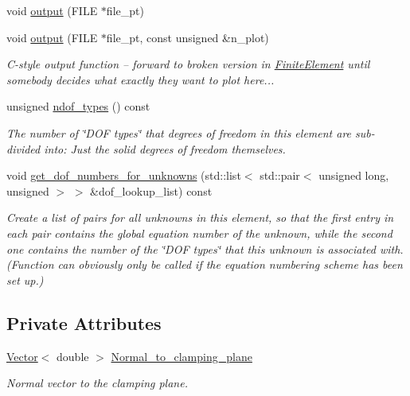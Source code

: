 \begin{DoxyCompactItemize}
void \hyperlink{classoomph_1_1ClampedHermiteShellBoundaryConditionElement_af1b8f1785d656386e36a01336611a22d}{output} (F\+I\+LE $\ast$file\+\_\+pt)
\item 
void \hyperlink{classoomph_1_1ClampedHermiteShellBoundaryConditionElement_ade7c773aa9f4587d25945b4f4860a690}{output} (F\+I\+LE $\ast$file\+\_\+pt, const unsigned \&n\+\_\+plot)
\begin{DoxyCompactList}\small\item\em C-\/style output function -- forward to broken version in \hyperlink{classoomph_1_1FiniteElement}{Finite\+Element} until somebody decides what exactly they want to plot here... \end{DoxyCompactList}\item 
unsigned \hyperlink{classoomph_1_1ClampedHermiteShellBoundaryConditionElement_a189db759eda561b5ae63ae9527b3ae39}{ndof\+\_\+types} () const
\begin{DoxyCompactList}\small\item\em The number of \char`\"{}\+D\+O\+F types\char`\"{} that degrees of freedom in this element are sub-\/divided into\+: Just the solid degrees of freedom themselves. \end{DoxyCompactList}\item 
void \hyperlink{classoomph_1_1ClampedHermiteShellBoundaryConditionElement_a7b18a5df8ade2926ccd6e7bcfa182dd9}{get\+\_\+dof\+\_\+numbers\+\_\+for\+\_\+unknowns} (std\+::list$<$ std\+::pair$<$ unsigned long, unsigned $>$ $>$ \&dof\+\_\+lookup\+\_\+list) const
\begin{DoxyCompactList}\small\item\em Create a list of pairs for all unknowns in this element, so that the first entry in each pair contains the global equation number of the unknown, while the second one contains the number of the \char`\"{}\+D\+O\+F types\char`\"{} that this unknown is associated with. (Function can obviously only be called if the equation numbering scheme has been set up.) \end{DoxyCompactList}\end{DoxyCompactItemize}
\subsection*{Private Attributes}
\begin{DoxyCompactItemize}
\item 
\hyperlink{classoomph_1_1Vector}{Vector}$<$ double $>$ \hyperlink{classoomph_1_1ClampedHermiteShellBoundaryConditionElement_ae374c52cd948ff9871ea64442ef8a53d}{Normal\+\_\+to\+\_\+clamping\+\_\+plane}
\begin{DoxyCompactList}\small\item\em Normal vector to the clamping plane. \end{DoxyCompactList}\end{DoxyCompactItemize}
